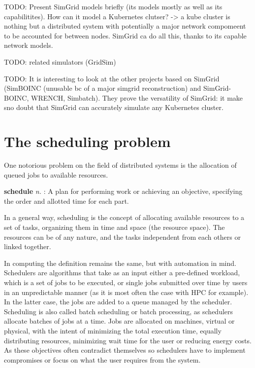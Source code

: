 TODO: Present SimGrid models briefly (its models mostly as well as its
capabilitites).
How can it model a Kubernetes clutser? -> a kube cluster is nothing but a
distributed system with potentially a major network compomeent to be accounted
for between nodes. SimGrid ca do all this, thanks to its capable network
models.

TODO: related simulators (GridSim)

TODO: It is interesting to look at the other projects based on SimGrid
(SimBOINC (unusable bc of a major simgrid reconstruction) and SimGrid-BOINC, WRENCH, Simbatch). They prove the
versatility of SimGrid: it make sno doubt that SimGrid can accurately simulate
any Kubernetes cluster.

\section{The scheduling problem}


One notorious problem on the field of distributed systems is the allocation of
queued jobs to available resources.

\begin{displayquote}[][]
	\textbf{schedule} \textit{n.} : A plan for
	performing work or achieving an objective, specifying the order and
	allotted time for each part.
\end{displayquote}

In a general way, scheduling is the concept of allocating available resources
to a set of tasks, organizing them in time and space (the resource space). The
resources can be of any nature, and the tasks independent from each others or
linked together.

In computing the definition remains the same, but with automation in mind.
Schedulers are algorithms that take as an input either a pre-defined workload,
which is a set of jobs  to be executed, or single jobs submitted over time by
users in an unpredictable manner (as it is most often the case with HPC for
example). In the latter case, the jobs are added to a queue managed by the
scheduler. Scheduling is also called batch scheduling or batch processing, as
schedulers allocate batches of jobs at a time. Jobs are allocated on machines,
virtual or physical, with the intent of minimizing the total execution time,
equally distributing resources, minimizing wait time for the user or reducing
energy costs. As these objectives often contradict themselves so schedulers have
to implement compromises or focus on what the user requires from the system.

